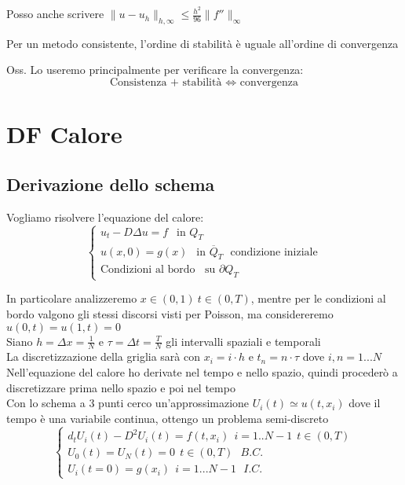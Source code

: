 \documentclass{article}
\begin{document}
Posso anche scrivere $\|u-u_h\|_{h,\infty}\le \frac{h^2}{96}\|f''\|_{\infty}$\\




\begin{teo}
Per un metodo consistente, l'ordine di stabilità è uguale all'ordine di convergenza
\end{teo}

Oss. Lo useremo principalmente per verificare la convergenza:
\[
\text{Consistenza + stabilità } \Longleftrightarrow \text{ convergenza} 
\]


\newpage




\section{DF Calore}

\subsection{Derivazione dello schema}

Vogliamo risolvere l'equazione del calore:
\[
\begin{cases}
    u_t - D\Delta u =f \ \ \text{ in } Q_T\\
    u(x,0)=g(x) \ \ \text{ in } \overline{Q}_T \ \ \ \text{condizione iniziale}\\
    \text{Condizioni al bordo } \ \text{ su } \partial Q_T
\end{cases}
\]

In particolare analizzeremo $x\in(0,1) \ t\in(0,T)$, mentre per le condizioni al bordo valgono gli stessi discorsi visti per Poisson, ma considereremo $u(0,t)=u(1,t)=0$\\


Siano $h=\Delta x=\frac{1}{N}$ e $\tau=\Delta t=\frac{T}{N}$ gli intervalli spaziali e temporali\\
La discretizzazione della griglia sarà con $x_i=i\cdot h$ e $t_n=n\cdot\tau$ dove $i,n=1...N$\\

Nell'equazione del calore ho derivate nel tempo e nello spazio, quindi procederò a discretizzare prima nello spazio e poi nel tempo\\


Con lo schema a 3 punti cerco un'approssimazione $U_i(t)\simeq u(t,x_i)$ dove il tempo è una variabile continua, ottengo un problema semi-discreto
\[
\begin{cases}
    d_t U_i(t)-D^2 U_i(t)=f(t,x_i) \ \ i=1..N-1 \ \ t\in (0,T)\\
    U_0(t) = U_N(t)=0 \ \ t\in (0,T) \ \ \ B.C.\\
    U_i(t=0)=g(x_i) \ \ i=1...N-1  \ \ \ I.C.
\end{cases}
\]
\end{document}
